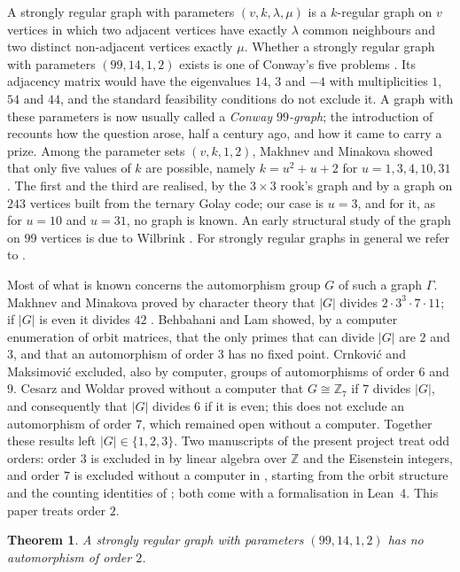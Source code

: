\documentclass[11pt]{amsart}
\newtheorem{theorem}{Theorem}[section]
\theoremstyle{definition}
\theoremstyle{remark}
\newcommand{\Z}{\mathbb{Z}}
\newcommand{\G}{\Gamma}
\begin{document}
A strongly regular graph with parameters $(v,k,\lambda,\mu)$ is a $k$-regular graph on $v$ vertices in which two adjacent
vertices have exactly $\lambda$ common neighbours and two distinct non-adjacent vertices exactly $\mu$. Whether a strongly
regular graph with parameters $(99,14,1,2)$ exists is one of Conway's five problems \cite{Conway}. Its adjacency matrix would
have the eigenvalues $14$, $3$ and $-4$ with multiplicities $1$, $54$ and $44$, and the standard feasibility conditions do not
exclude it. A graph with these parameters is now usually called a \emph{Conway $99$-graph}; the introduction of \cite{CW}
recounts how the question arose, half a century ago, and how it came to carry a prize. Among the parameter sets $(v,k,1,2)$,
Makhnev and Minakova \cite{MM} showed that only five values of $k$ are possible, namely $k=u^2+u+2$ for $u=1,3,4,10,31$. The
first and the third are realised, by the $3\times3$ rook's graph and by a graph on $243$ vertices built from the ternary
Golay code; our case is $u=3$, and for it, as for $u=10$ and $u=31$, no graph is known. An early structural study of the graph on $99$ vertices is due to Wilbrink \cite{W84}. For strongly regular graphs in general we refer to \cite{BvM,GR}.

Most of what is known concerns the automorphism group $G$ of such a graph $\G$. Makhnev and Minakova \cite{MM} proved by
character theory that $|G|$ divides $2\cdot3^3\cdot7\cdot11$; if $|G|$ is even it divides $42$ \cite{MM,Mak}. Behbahani and
Lam \cite{B09,BL} showed, by a computer enumeration of orbit matrices, that the only primes that can divide $|G|$ are $2$
and $3$, and that an automorphism of order $3$ has no fixed point. Crnkovi\'c and Maksimovi\'c \cite[Theorems~7.2 and~7.3]{CM} excluded, also by computer, groups of automorphisms of order $6$ and $9$. Cesarz and Woldar \cite[Corollaries~3.13 and~4.15]{CW} proved without a computer that
$G\cong\Z_7$ if $7$ divides $|G|$, and consequently that $|G|$ divides $6$ if it is even; this does not exclude an
automorphism of order $7$, which remained open without a computer. Together these results left $|G|\in\{1,2,3\}$. Two
manuscripts of the present project treat odd orders: order $3$ is excluded in \cite{D3} by linear algebra over $\Z$ and the
Eisenstein integers, and order $7$ is excluded without a computer in \cite{D7}, starting from the orbit structure and the
counting identities of \cite{CW}; both come with a formalisation in Lean~4. This paper treats order $2$.

\begin{theorem}\label{thm:main}
A strongly regular graph with parameters $(99,14,1,2)$ has no automorphism of order $2$.
\end{theorem}
\end{document}
